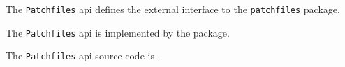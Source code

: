 The {\tt Patchfiles} api defines the external interface to the {\tt patchfiles} package.

The {\tt Patchfiles} api is implemented by the  package.

The {\tt Patchfiles} api source code is .
